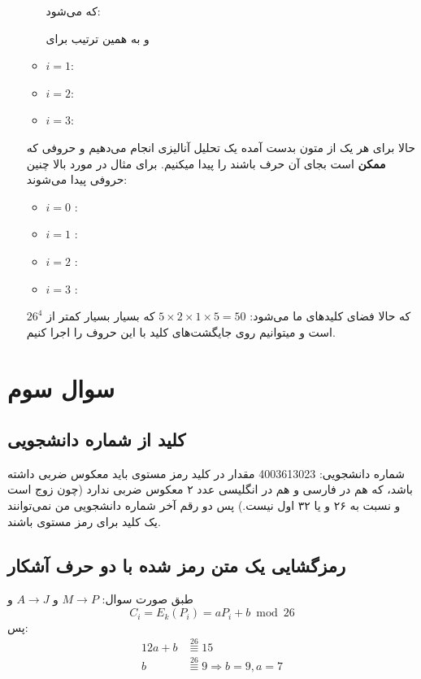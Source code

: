 \documentclass{article}
\newcommand{\modts}{\overset{26}{\equiv}}
\begin{document}
\begin{enumerate}
\begin{itemize}
که می‌شود:

و به همین ترتیب برای 
\item $i = 1$: 
\item $i = 2$: 
\item $i = 3$:  
\end{itemize}
حالا برای هر یک از متون بدست آمده یک تحلیل آنالیزی انجام می‌دهیم و حروفی که \textbf{ممکن} است بجای آن حرف باشند را پیدا میکنیم.
برای مثال در مورد بالا چنین حروفی پیدا می‌شوند:
\begin{latin}
\begin{itemize}
\item $i = 0$ :  
\item $i = 1$ : 
\item $i = 2$ : 
\item $i = 3$ : 
\end{itemize}
\end{latin}

که حالا فضای کلید‌های ما می‌شود:
$5 \times 2 \times 1 \times 5 = 50$
که بسیار بسیار کمتر از 
$26^4$
است و میتوانیم روی جایگشت‌های کلید با این حروف 
را اجرا کنیم.
\end{enumerate}

\section{سوال سوم}
\subsection{کلید از شماره دانشجویی}
شماره دانشجویی:
4003613023
مقدار  در کلید رمز مستوی باید معکوس ضربی داشته باشد، که هم در فارسی و هم در انگلیسی عدد ۲ معکوس ضربی ندارد (چون زوج است و نسبت به ۲۶ و یا ۳۲ اول نیست.) پس دو رقم آخر شماره دانشجویی من نمی‌توانند یک کلید برای رمز مستوی باشند.

\subsection{رمزگشایی یک متن رمز شده با دو حرف آشکار}
طبق صورت سوال: $M \rightarrow P$ و 
$A \rightarrow J$
و
\begin{equation}
C_i = E_k(P_i) = aP_i + b \bmod{26}
\end{equation}
پس:
\begin{equation*}
\begin{split}
12a + b & \modts 15 \\
b & \modts 9 \Rightarrow b = 9, a = 7
\end{split}
\end{equation*}
\end{document}
